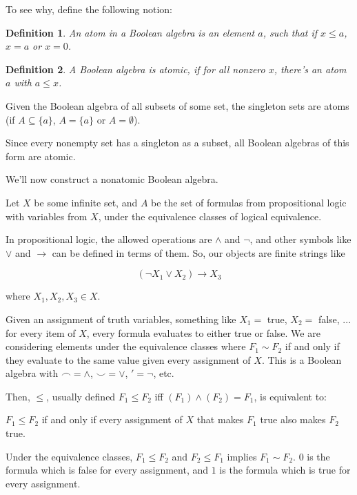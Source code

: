 \documentclass{article}
\newtheorem*{definition}{Definition}
\begin{document}
        To see why, define the following notion:

        \begin{definition}
          An atom in a Boolean algebra is an element $a$, such that if $x \leq
          a$, $x = a$ or $x = 0$.
        \end{definition}
        \begin{definition}
          A Boolean algebra is atomic, if for all nonzero $x$, there's an atom $a$ with
          $a \leq x$.
        \end{definition}

        Given the Boolean algebra of all subsets of some set, the singleton sets
        are atoms (if $A \subseteq \{a\}$, $A = \{a\}$ or $A = \emptyset$).

        Since every nonempty set has a singleton as a subset, all Boolean
        algebras of this form are atomic.

        We'll now construct a nonatomic Boolean algebra.

        Let $X$ be some infinite set, and $A$ be the set of formulas from
        propositional logic with variables from $X$, under the
        equivalence classes of logical equivalence.

        In propositional logic, the allowed operations are $\wedge$ and $\neg$,
        and other symbols like $\vee$ and $\rightarrow$ can be defined in
        terms of them. So, our objects are finite strings like

        \[ (\neg X_1 \vee X_2) \rightarrow X_3 \]

        where $X_1, X_2, X_3 \in X$.

        Given an assignment of truth variables, something like $X_1 = $ true,
        $X_2 = $ false, ... for every item of $X$, every formula evaluates to
        either true or false. We are considering elements under the equivalence
        classes where $F_1 \sim F_2$ if and only if they
        evaluate to the same value given every assignment of $X$. This is a
        Boolean algebra with $\frown = \wedge$, $\smile = \vee$, $' = \neg$, etc.

        Then, $\leq$, usually defined $F_1 \leq F_2$ iff $(F_1) \wedge (F_2) =
        F_1$, is equivalent to:

        $F_1 \leq F_2$ if and only if every assignment of $X$ that makes
        $F_1$ true also makes $F_2$ true.

        Under the equivalence classes, $F_1 \leq F_2$ and $F_2 \leq F_1$ implies
        $F_1 \sim F_2$. $0$ is the formula which is false for every assignment,
        and $1$ is the formula which is true for every assignment.
\end{document}
